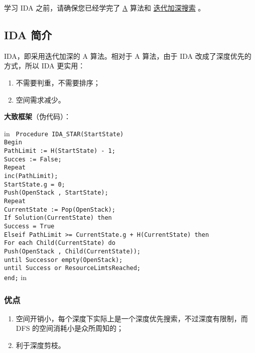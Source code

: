 
学习 IDA 之前，请确保您已经学完了 \href{/search/astar}{A} 算法和 \href{/search/iterative}{迭代加深搜索} 。

\subsection{IDA 简介}

IDA，即采用迭代加深的 A 算法。相对于 A 算法，由于 IDA 改成了深度优先的方式，所以 IDA 更实用：

\begin{enumerate}
\item 不需要判重，不需要排序；
\item 空间需求减少。
\end{enumerate}

\textbf{大致框架}（伪代码）：

 in
\texttt{
Procedure IDA_STAR(StartState)\\Begin\\PathLimit := H(StartState) - 1;\\Succes := False;\\Repeat\\inc(PathLimit);\\StartState.g = 0;\\Push(OpenStack , StartState);\\Repeat\\CurrentState := Pop(OpenStack);\\If Solution(CurrentState) then\\Success = True\\Elseif PathLimit >= CurrentState.g + H(CurrentState) then\\For each Child(CurrentState) do\\Push(OpenStack , Child(CurrentState));\\until Successor empty(OpenStack);\\until Success or ResourceLimtsReached;\\end;}
 in

\subsubsection{优点}

\begin{enumerate}
\item 空间开销小，每个深度下实际上是一个深度优先搜索，不过深度有限制，而 DFS 的空间消耗小是众所周知的；
\item 利于深度剪枝。
\end{enumerate}

